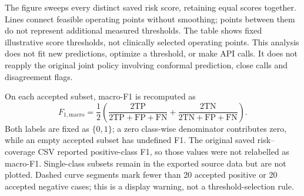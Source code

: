 The figure sweeps every distinct saved risk score, retaining equal scores
together. Lines connect feasible operating points without smoothing; points
between them do not represent additional measured thresholds. The table shows
fixed illustrative score thresholds, not clinically selected operating
points. This analysis does not fit new predictions, optimize a threshold,
or make API calls. It does not reapply the original joint policy involving
conformal prediction, close calls and disagreement flags.

On each accepted subset, macro-F1 is recomputed as
\begin{equation}
F_{1,\mathrm{macro}}=
\frac{1}{2}\left(
\frac{2\mathrm{TP}}{2\mathrm{TP}+\mathrm{FP}+\mathrm{FN}}+
\frac{2\mathrm{TN}}{2\mathrm{TN}+\mathrm{FP}+\mathrm{FN}}
\right).
\end{equation}
Both labels are fixed as $\{0,1\}$; a zero class-wise denominator contributes
zero, while an empty accepted subset has undefined F1. The original saved
risk--coverage CSV reported positive-class F1, so those values were not
relabelled as macro-F1. Single-class subsets remain in the exported source
data but are not plotted. Dashed curve segments mark fewer than 20 accepted
positive or 20 accepted negative cases; this is a display warning, not a
threshold-selection rule.

